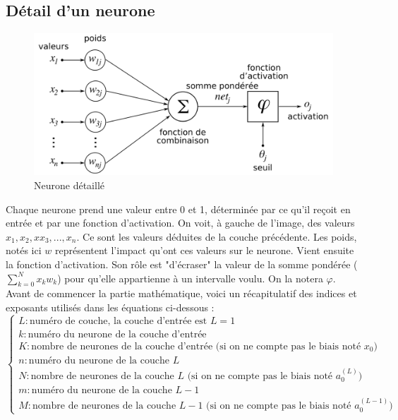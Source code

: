 \subsection{Détail d'un neurone}
	
	\begin{figure}[H]
		\centering
		\includegraphics[width=.75\linewidth]{images/neurone}
		\caption{Neurone détaillé}
	\end{figure}
	
	Chaque neurone prend une valeur entre 0 et 1, déterminée par ce qu'il reçoit en entrée et par une fonction d'activation. On voit, à gauche de l'image, des valeurs $x_1, x_2,x x_3, ..., x_n$. Ce sont les valeurs déduites de la couche précédente. Les poids, notés ici $w$ représentent l'impact qu'ont ces valeurs sur le neurone. Vient ensuite la fonction d'activation. Son rôle est "d'écraser" la valeur de la somme pondérée ($\sum_{k=0}^{N}x_kw_{k}$) pour qu'elle appartienne à un intervalle voulu. On la notera $\varphi$.\\
	
	Avant de commencer la partie mathématique, voici un récapitulatif des indices et exposants utilisés dans les équations ci-dessous :
	$$
	\begin{cases}
		L : \text{numéro de couche, la couche d'entrée est $L = 1$}\\
		k : \text{numéro du neurone de la couche d'entrée}\\
		K : \text{nombre de neurones de la couche d'entrée (si on ne compte pas le biais noté $x_0$)}\\
		n : \text{numéro du neurone de la couche $L$}\\
		N : \text{nombre de neurones de la couche $L$ (si on ne compte pas le biais noté $a_0^{(L)}$)}\\
		m : \text{numéro du neurone de la couche $L-1$}\\
		M : \text{nombre de neurones de la couche $L-1$ (si on ne compte pas le biais noté $a_0^{(L-1)}$)}
	\end{cases}
	$$
	
